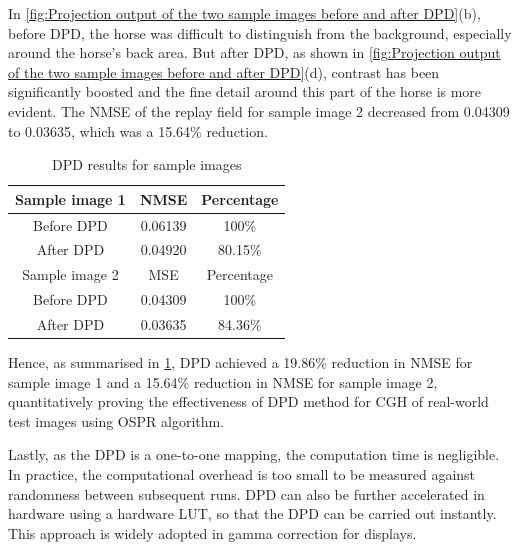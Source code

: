 In \cref{fig:Projection output of the two sample images before and after DPD}(b), before DPD, the horse was difficult to distinguish from the background, especially around the horse's back area. But after DPD, as shown in \cref{fig:Projection output of the two sample images before and after DPD}(d), contrast has been significantly boosted and the fine detail around this part of the horse is more evident. The NMSE of the replay field for sample image 2 decreased from 0.04309 to 0.03635, which was a 15.64\% reduction.


\begin{table}[H]
    \begin{center}
        \begin{tabular}{ccc}
            \hline
            \multicolumn{1}{|c|}{Sample image 1} & \multicolumn{1}{c|}{NMSE}    & \multicolumn{1}{c|}{Percentage} \\ \hline
            \multicolumn{1}{|c|}{Before DPD}     & \multicolumn{1}{c|}{0.06139} & \multicolumn{1}{c|}{100\%}      \\ \hline
            \multicolumn{1}{|c|}{After DPD}      & \multicolumn{1}{c|}{0.04920} & \multicolumn{1}{c|}{80.15\%}    \\ \hline\hline
            \multicolumn{1}{|c|}{Sample image 2} & \multicolumn{1}{c|}{MSE}     & \multicolumn{1}{c|}{Percentage} \\ \hline
            \multicolumn{1}{|c|}{Before DPD}     & \multicolumn{1}{c|}{0.04309} & \multicolumn{1}{c|}{100\%}      \\ \hline
            \multicolumn{1}{|c|}{After DPD}      & \multicolumn{1}{c|}{0.03635} & \multicolumn{1}{c|}{84.36\%}    \\ \hline
        \end{tabular}
        \caption{DPD results for sample images}
        \label{tab:DPD results for sample images}
    \end{center}
\end{table}

Hence, as summarised in \cref{tab:DPD results for sample images}, DPD achieved a 19.86\% reduction in NMSE for sample image 1 and a 15.64\% reduction in NMSE for sample image 2, quantitatively proving the effectiveness of DPD method for CGH of real-world test images using OSPR algorithm.

Lastly, as the DPD is a one-to-one mapping, the computation time is negligible. In practice, the computational overhead is too small to be measured against randomness between subsequent runs. DPD can also be further accelerated in hardware using a hardware LUT, so that the DPD can be carried out instantly. This approach is widely adopted in gamma correction for displays.




